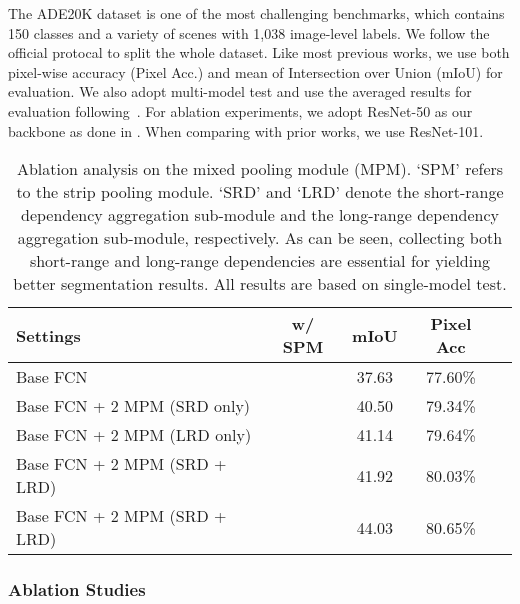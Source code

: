 \documentclass[final]{cvpr}
\newcommand{\cmark}{\ding{51}}\newcommand{\xmark}{\ding{55}}
\begin{document}
The ADE20K dataset \cite{zhou2017scene} is one of the most challenging benchmarks, which contains 150 classes and a variety of scenes with 1,038 image-level labels.
We follow the official protocal to split the whole dataset.
Like most previous works, we use both pixel-wise accuracy (Pixel Acc.) and mean of Intersection over Union (mIoU) for evaluation.
We also adopt multi-model test and use the averaged results for evaluation following~\cite{lin2017refinenet,zhao2016pyramid}.
For ablation experiments, we adopt ResNet-50 as our backbone as done in \cite{zhao2016pyramid}.
When comparing with prior works, we use ResNet-101.


\begin{table}[t]
  \centering
  \small
  \setlength\tabcolsep{1.0mm}
  \renewcommand\arraystretch{1.0}
  \begin{tabular}{lcccc} \toprule[0.5pt]
    Settings & w/ SPM & mIoU & Pixel Acc \\ \midrule[0.5pt] \midrule[0.5pt]
Base FCN   & \xmark & 37.63 & 77.60\% \\
    Base FCN + 2 MPM (SRD only)  & \xmark & 40.50 & 79.34\% \\
    Base FCN + 2 MPM (LRD only) & \xmark & 41.14 & 79.64\% \\
    \midrule[0.5pt] \midrule[0.5pt]
Base FCN + 2 MPM (SRD + LRD)  & \xmark & 41.92 & 80.03\% \\
    Base FCN + 2 MPM (SRD + LRD)  & \cmark & 44.03 & 80.65\% \\
    \bottomrule[0.5pt]
  \end{tabular}
  \vspace{0pt}
  \caption{Ablation analysis on the mixed pooling module (MPM). 
  `SPM' refers to the strip pooling module. `SRD' and `LRD' denote the short-range dependency aggregation sub-module and the long-range dependency aggregation sub-module, respectively.
  As can be seen, collecting both short-range and long-range dependencies are essential for yielding better segmentation results. 
  All results are based on single-model test.}
  \label{tab:mp_modules}
\end{table}

\subsubsection{Ablation Studies}
\end{document}
